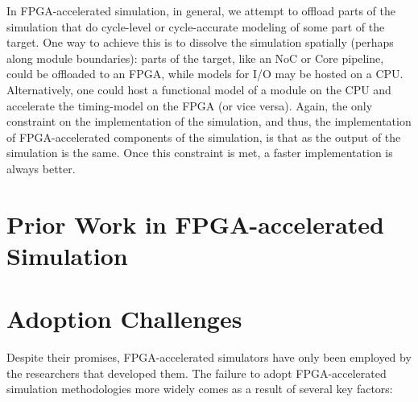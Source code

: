 
In FPGA-accelerated simulation, in general, we attempt to offload parts of the
simulation that do cycle-level or cycle-accurate modeling of some part of the
target. One way to achieve this is to dissolve the simulation spatially
(perhaps along module boundaries): parts of the target, like an NoC or Core
pipeline, could be offloaded to an FPGA, while models for I/O may be hosted on
a CPU.  Alternatively, one could host a functional model of a module on the CPU
and accelerate the timing-model on the FPGA (or vice versa).  Again, the only
constraint on the implementation of the simulation, and thus, the
implementation of FPGA-accelerated components of the simulation, is that as the
output of the simulation is the same. Once this constraint is met, a faster
implementation is always better.

\section{Prior Work in FPGA-accelerated Simulation}

\section{Adoption Challenges}

Despite their promises, FPGA-accelerated simulators have only been employed by
the researchers that developed them. The failure to adopt FPGA-accelerated
simulation methodologies more widely comes as a result of several key factors:

